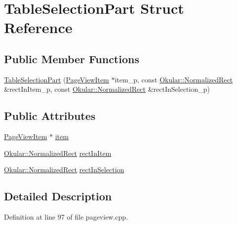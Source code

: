 \hypertarget{structTableSelectionPart}{\section{Table\+Selection\+Part Struct Reference}
\label{structTableSelectionPart}
}
\subsection*{Public Member Functions}
\begin{DoxyCompactItemize}
\item 
\hyperlink{structTableSelectionPart_a45fb7ea250d95d727d1c856fe1f9a982}{Table\+Selection\+Part} (\hyperlink{classPageViewItem}{Page\+View\+Item} $\ast$item\+\_\+p, const \hyperlink{classOkular_1_1NormalizedRect}{Okular\+::\+Normalized\+Rect} \&rect\+In\+Item\+\_\+p, const \hyperlink{classOkular_1_1NormalizedRect}{Okular\+::\+Normalized\+Rect} \&rect\+In\+Selection\+\_\+p)
\end{DoxyCompactItemize}
\subsection*{Public Attributes}
\begin{DoxyCompactItemize}
\item 
\hyperlink{classPageViewItem}{Page\+View\+Item} $\ast$ \hyperlink{structTableSelectionPart_a400edc4e1ec30e28ff8159a741776e4b}{item}
\item 
\hyperlink{classOkular_1_1NormalizedRect}{Okular\+::\+Normalized\+Rect} \hyperlink{structTableSelectionPart_ade01925b1444763cb413ad51ae7729a7}{rect\+In\+Item}
\item 
\hyperlink{classOkular_1_1NormalizedRect}{Okular\+::\+Normalized\+Rect} \hyperlink{structTableSelectionPart_a237572cb28552e59818071208c21ee43}{rect\+In\+Selection}
\end{DoxyCompactItemize}


\subsection{Detailed Description}


Definition at line 97 of file pageview.\+cpp.




